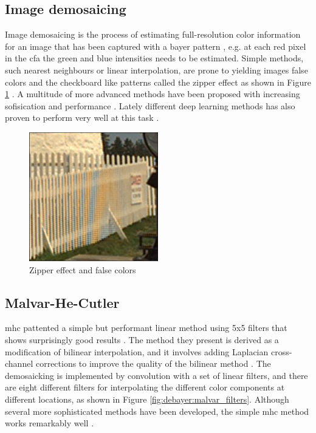 \subsection{Image demosaicing}
Image demosaicing is the process of estimating full-resolution color information for an image that has been captured with a bayer pattern \cite{liImageDemosaicingSystematic2008}, e.g. at each red pixel in the \gls{cfa} the green and blue intensities needs to be estimated.
Simple methods, such nearest neighbours or linear interpolation, are prone to yielding images false colors and the checkboard like patterns called the zipper effect as shown in Figure \ref{fig:artifacts_gioia} \cite{gioiaDataDrivenConvolutionalModel2021} \cite{liImageDemosaicingSystematic2008}.
A multitude of more advanced methods have been proposed with increasing sofisication and performance \cite{liImageDemosaicingSystematic2008}.
Lately different deep learning methods has also proven to perform very well at this task \cite{kwanComparisonDeepLearning2019}.

\begin{figure}[H]
    \centering
    \includegraphics[width=0.5\textwidth]{figures/debayer/artifacts_gioia.png}
    \caption{Zipper effect and false colors \cite{gioiaDataDrivenConvolutionalModel2021}}
    \label{fig:artifacts_gioia}
\end{figure}

\subsection{Malvar-He-Cutler}
\gls{mhc} pattented a simple but performant linear method using 5x5 filters that shows surprisingly good results \cite{malvarHighqualityGradientcorrectedLinear2009}.
The method they present is derived as a modification of bilinear interpolation, and it involves adding Laplacian cross-channel corrections to improve the quality of the bilinear method \cite{getreuerMalvarHeCutlerLinearImage2011}.
The demosaicking is implemented by convolution with a set of linear filters, and there are eight different filters for interpolating the different color components at different locations, as shown in Figure \ref{fig:debayer:malvar_filters}.
Although several more sophisticated methods have been developed, the simple \gls{mhc} method works remarkably well \cite{liImageDemosaicingSystematic2008}\cite{kwanComparisonDeepLearning2019}\cite{getreuerMalvarHeCutlerLinearImage2011}.


